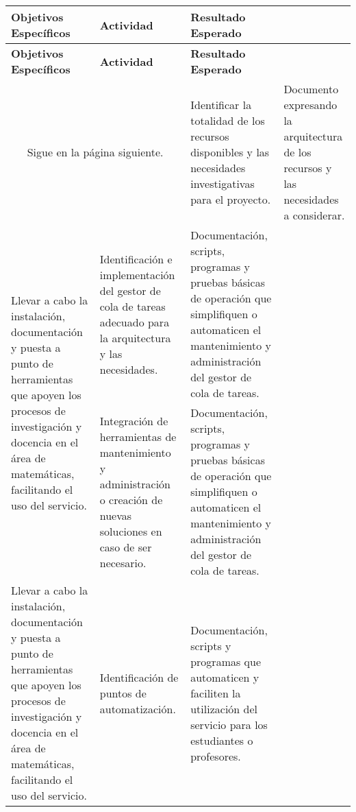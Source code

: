 \begin{spacing}{1.5}
  \begin{longtable}{m{4.8cm}m{4.8cm}m{4.8cm}}
    \hline
    \textbf{Objetivos Específicos} & \textbf{Actividad} &\textbf{Resultado Esperado} \\
    \hline 
    \endfirsthead
    \hline
    \textbf{Objetivos Específicos} & \textbf{Actividad} &\textbf{Resultado Esperado } \\
    \hline 
    \endhead
    \multicolumn{2}{c}{Sigue en la página siguiente.}
    \endfoot
    \endlastfoot
    \text Identificar recursos disponibles y necesidades investigativas. &
    Identificar la totalidad de los recursos disponibles y las necesidades
    investigativas para el proyecto.                                     &
    Documento expresando la arquitectura de los
    recursos y las necesidades a considerar.
    \\
    \hline    
    \multirow{2}{4.3cm}{Llevar a cabo la instalación, documentación y puesta
      a punto de herramientas que apoyen los procesos de investigación y
      docencia en
    el área de matemáticas, facilitando el uso del servicio.}            &
    Identificación e
    implementación del gestor de cola de tareas adecuado para la arquitectura
    y las
    necesidades.                                                         &
    Documentación, scripts, programas y pruebas básicas de operación
    que simplifiquen o automaticen el mantenimiento y administración del
    gestor de
    cola de tareas.
    \\ \cline{2-3}
                                                                         &
    Integración de herramientas de mantenimiento y administración o
    creación de nuevas soluciones en caso de ser necesario.              &
    Documentación,
    scripts, programas y pruebas básicas de operación que simplifiquen o
    automaticen el mantenimiento y administración del gestor de cola de
    tareas.                                                                \\
    \hline
    \multirow{2}{4.3cm}{Llevar a cabo la instalación, documentación y puesta a punto de herramientas que apoyen los procesos de investigación y docencia en el área de matemáticas, facilitando el uso del servicio.}            &
    Identificación de puntos de automatización.                                                         &
    Documentación, scripts y programas que automaticen y faciliten la utilización del servicio para los estudiantes o profesores.

\end{longtable}
\end{spacing}

